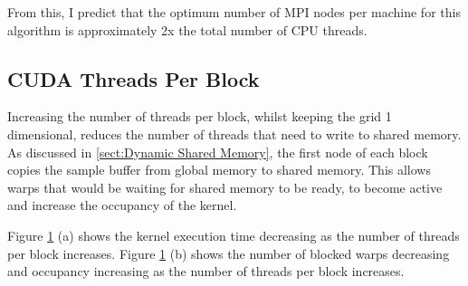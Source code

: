\documentclass[11pt,a4paper]{article}
\begin{document}
From this, I predict that the optimum number of MPI nodes per machine for this algorithm is approximately 2x the total number of CPU threads.

\subsection{CUDA Threads Per Block}
Increasing the number of threads per block, whilst keeping the grid 1 dimensional, reduces the number of threads that need to write to shared memory. As discussed in \ref{sect:Dynamic Shared Memory}, the first node of each block copies the sample buffer from global memory to shared memory. This allows warps that would be waiting for shared memory to be ready, to become active and increase the occupancy of the kernel.

\begin{figure}[H]%
    \centering
    \qquad
    \vspace{5pt}
    \caption{}%
    \label{fig:cuda_threads_per_block}%
\end{figure}

Figure \ref{fig:cuda_threads_per_block} (a) shows the kernel execution time decreasing as the number of threads per block increases. Figure \ref{fig:cuda_threads_per_block} (b) shows the number of blocked warps decreasing and occupancy increasing as the number of threads per block increases.
\end{document}
